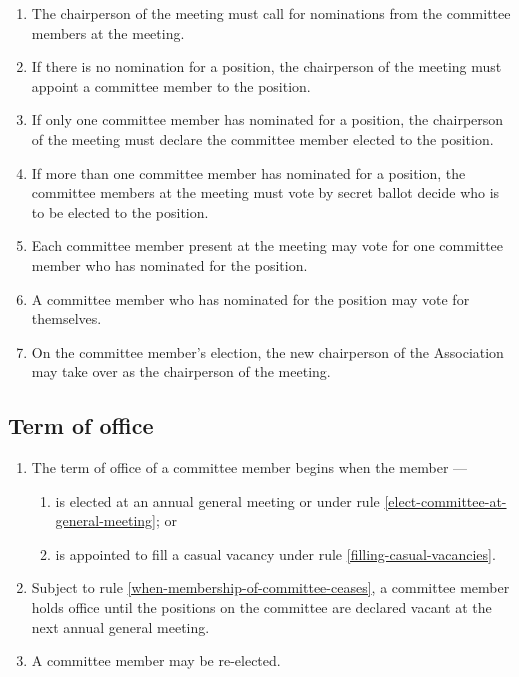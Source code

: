 \documentclass[../constitution.tex]{subfiles}
\begin{document}
\begin{enumerate}
  \begin{enumerate}
  \item The chairperson of the meeting must call for nominations from the committee members at the meeting.
  \item If there is no nomination for a position, the chairperson of the meeting must appoint a committee member to the position.
  \item If only one committee member has nominated for a position, the chairperson of the meeting must declare the committee member elected to the position.
  \item If more than one committee member has nominated for a position, the committee members at the meeting must vote by secret ballot decide who is to be elected to the position.
  \item Each committee member present at the meeting may vote for one committee member who has nominated for the position.
  \item A committee member who has nominated for the position may vote for themselves.
  \item On the committee member's election, the new chairperson of the Association may take over as the chairperson of the meeting.
  \end{enumerate}

\end{enumerate}

\hypertarget{term-of-office}{%
\subsection{Term of office}\label{term-of-office}}

\begin{enumerate}

\item The term of office of a committee member begins when the member ---

  \begin{enumerate}
  
  \item is elected at an annual general meeting or under rule \ref{elect-committee-at-general-meeting}; or
  \item is appointed to fill a casual vacancy under rule \ref{filling-casual-vacancies}.
  \end{enumerate}
\item Subject to rule \ref{when-membership-of-committee-ceases}, a committee member holds office until the positions on the committee are declared vacant at the next annual general meeting.
\item A committee member may be re-elected.
\end{enumerate}
\end{document}
